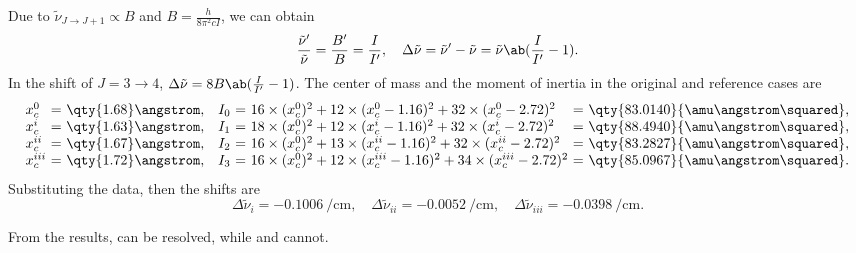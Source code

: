 \begin{solution}\leavevmode
  \begin{enumext}
    \item Due to $\tilde \nu_{J \to J+1} \propto B$
    and $B = \frac{h}{8\pi^2cI}$, we can obtain
    \[
      \frac{\tilde \nu'}{\tilde \nu} = \frac{B'}{B} = \frac{I}{I'}, \quad
      \Delta \tilde \nu = \tilde \nu' - \tilde \nu
    = \tilde \nu \ab(\frac{I}{I'} - 1).
    \]
    In the shift of $J = 3 \to 4$,
    $\Delta \tilde \nu = 8B \ab(\frac{I}{I'} - 1)$.
    The center of mass and the moment of inertia in the original and
    reference cases are
    \[\begin{array}{l@{~}c@{~}l@{\quad}l@{~}c@{~}l@{~}c@{~}l}
      x_c^0     & = & \qty{1.68}\angstrom, &
      I_0       & = & 16 \times (x_c^0)^2 + 12 \times (x_c^0 - 1.16)^2
                    + 32 \times (x_c^0 - 2.72)^2
                & = & \qty{83.0140}{\amu \angstrom\squared},\\
      x_c^i     & = & \qty{1.63}\angstrom, &
      I_1       & = & 18 \times (x_c^0)^2 + 12 \times (x_c^i - 1.16)^2
                    + 32 \times (x_c^i - 2.72)^2
                & = & \qty{88.4940}{\amu \angstrom\squared},\\
      x_c^{ii}  & = & \qty{1.67}\angstrom, &
      I_2       & = & 16 \times (x_c^0)^2 + 13 \times (x_c^{ii} - 1.16)^2
                    + 32 \times (x_c^{ii} - 2.72)^2
                & = & \qty{83.2827}{\amu \angstrom\squared},\\
      x_c^{iii} & = & \qty{1.72}\angstrom, & 
      I_3       & = & 16 \times (x_c^0)^2 + 12 \times (x_c^{iii} - 1.16)^2
                                + 34 \times (x_c^{iii} - 2.72)^2
                & = & \qty{85.0967}{\amu \angstrom\squared}.
    \end{array}\]
    Substituting the data, then the shifts are
    \[
      \Delta \tilde \nu_i     = \qty{-0.1006}{\per\cm}, \quad
      \Delta \tilde \nu_{ii}  = \qty{-0.0052}{\per\cm}, \quad
      \Delta \tilde \nu_{iii} = \qty{-0.0398}{\per\cm}.
    \]
    \item From the results,
     can be resolved, while 
    and  cannot.
  \end{enumext}
\end{solution}

\pagebreak

